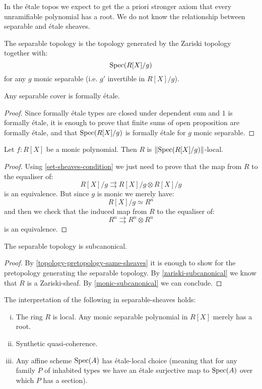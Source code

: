 \begin{remark}
In the étale topos we expect to get the a priori stronger axiom that every unramifiable polynomial has a root. We do not know the relationship between separable and étale sheaves.
\end{remark}

\begin{definition}
The separable topology is the topology generated by the Zariski topology together with:
\[\operatorname{Spec}(R[X]/g)\]
for any $g$ monic separable (i.e. $g'$ invertible in $R[X]/g$).
\end{definition}

\begin{lemma}\label{separable-included-etale}
Any separable cover is formally étale.
\end{lemma}

\begin{proof}
Since formally étale types are closed under dependent sum and $1$ is formally étale, it is enough to prove that finite sums of open proposition are formally étale, and that $\operatorname{Spec}(R[X]/g)$ is formally étale for $g$ monic separable.
\end{proof}

\begin{lemma}\label{monic-subcanonical}
Let $f:R[X]$ be a monic polynomial. Then $R$ is $\lVert \operatorname{Spec}(R[X]/g) \rVert$-local.
\end{lemma}

\begin{proof}
Using \cref{set-sheaves-condition} we just need to prove that the map from $R$ to the equaliser of:
\[R[X]/g \rightrightarrows R[X]/g \otimes R[X]/g\]
is an equivalence. But since $g$ is monic we merely have:
\[R[X]/g \simeq R^n\]
and then we check that the induced map from $R$ to the equaliser of:
\[R^n \rightrightarrows R^n\otimes R^n\]
is an equivalence.
\end{proof}

\begin{lemma}
The separable topology is subcanonical.
\end{lemma}

\begin{proof}
By \cref{topology-pretopology-same-sheaves} it is enough to show for the pretopology generating the separable topology. By \cref{zariski-subcanonical} we know that $R$ is a Zariski-sheaf. By \cref{monic-subcanonical} we can conclude. 
\end{proof}

\begin{theorem}
The interpretation of the following in separable-sheaves holds:
\begin{enumerate}[(i)]
\item The ring $R$ is local. Any monic separable polynomial in $R[X]$ merely has a root.
\item Synthetic quasi-coherence.
\item Any affine scheme $\operatorname{Spec}(A)$ has étale-local choice (meaning that for any family $P$ of inhabited types we have an étale surjective map to $\operatorname{Spec}(A)$ over which $P$ has a section).
\end{enumerate}
\end{theorem}

